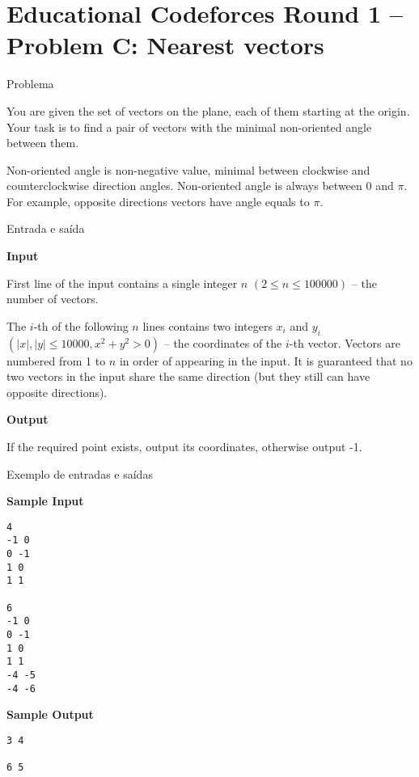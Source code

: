 \section{Educational Codeforces Round 1 -- Problem C: Nearest vectors}

\begin{frame}[fragile]{Problema}

You are given the set of vectors on the plane, each of them starting at the origin. Your task is 
to find a pair of vectors with the minimal non-oriented angle between them.

Non-oriented angle is non-negative value, minimal between clockwise and counterclockwise direction 
angles. Non-oriented angle is always between 0 and $\pi$. For example, opposite directions vectors 
have angle equals to $\pi$.

\end{frame}

\begin{frame}[fragile]{Entrada e saída}

\textbf{Input}

First line of the input contains a single integer $n$ $(2 \leq n \leq 100 000)$ -- the number of 
vectors.

The $i$-th of the following $n$ lines contains two integers $x_i$ and $y_i$ $(|x|, |y| \leq 10 000, x^2 + y^2 > 0)$ -- the coordinates of the $i$-th vector. Vectors are numbered from 1 to $n$ in order of appearing in the input. It is guaranteed that no two vectors in the input share the same direction (but they still can have opposite directions).

\textbf{Output}

If the required point exists, output its coordinates, otherwise output -1.

\end{frame}

\begin{frame}[fragile]{Exemplo de entradas e saídas}

\begin{minipage}[t]{0.5\textwidth}
\textbf{Sample Input}
\begin{verbatim}
4
-1 0
0 -1
1 0
1 1

6
-1 0
0 -1
1 0
1 1
-4 -5
-4 -6
\end{verbatim}
\end{minipage}
\begin{minipage}[t]{0.45\textwidth}
\textbf{Sample Output}
\begin{verbatim}
3 4

6 5
\end{verbatim}
\end{minipage}
\end{frame}

